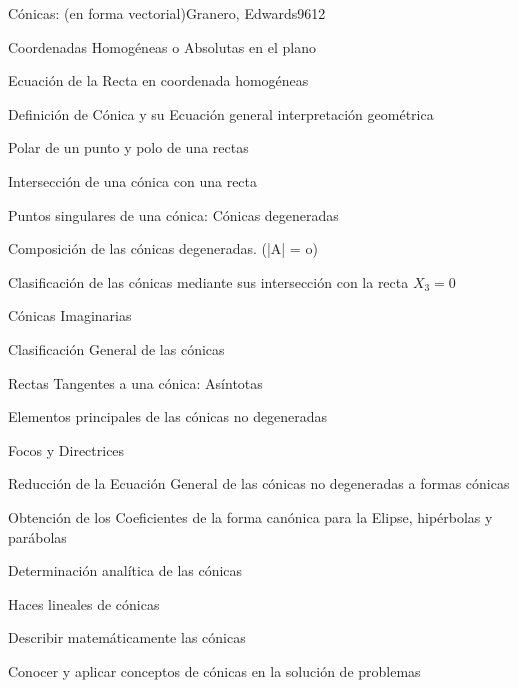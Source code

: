 \begin{sumilla}
\begin{unit}{C\'onicas: (en forma vectorial)}{Granero, Edwards96}{12}
\begin{topicos}
      	\item Coordenadas Homog\'eneas o Absolutas en el plano
	\item Ecuaci\'on de la Recta en coordenada homog\'eneas
	\item Definici\'on de C\'onica y su Ecuaci\'on general interpretaci\'on geom\'etrica
	\item Polar de un punto y polo de una  rectas
	\item Intersecci\'on de una c\'onica con una recta
	\item Puntos singulares de una c\'onica: C\'onicas degeneradas
	\item Composici\'on de las c\'onicas degeneradas. (|A| = o)
	\item Clasificaci\'on de las c\'onicas mediante sus intersecci\'on con la recta $X_3 = 0$
	\item C\'onicas Imaginarias
	\item Clasificaci\'on General de las c\'onicas
	\item Rectas Tangentes a una c\'onica: As\'intotas
	\item Elementos principales de las c\'onicas no degeneradas
	\item Focos y Directrices
	\item Reducci\'on de la Ecuaci\'on General de las c\'onicas no degeneradas a formas c\'onicas
	\item Obtenci\'on de los Coeficientes de la forma can\'onica para la Elipse, hip\'erbolas y par\'abolas
	\item Determinaci\'on anal\'itica de las c\'onicas
	\item Haces lineales de c\'onicas
   \end{topicos}

   \begin{objetivos}
      \item Describir matem\'aticamente las c\'onicas
      \item Conocer y aplicar conceptos de c\'onicas en la soluci\'on de problemas
   \end{objetivos}
\end{unit}

\begin{bibliografia}
\end{bibliografia}
\end{sumilla}
